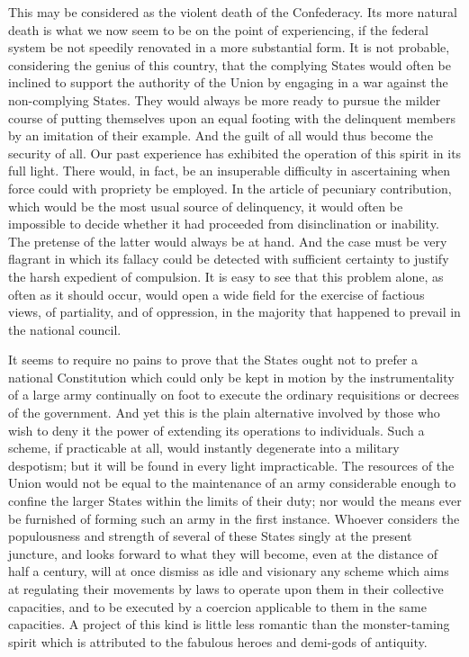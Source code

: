 This may be considered as the violent death of the Confederacy. Its more natural death is what we now seem to be on the point of experiencing, if the federal system be not speedily renovated in a more substantial form. It is not probable, considering the genius of this country, that the complying States would often be inclined to support the authority of the Union by engaging in a war against the non-complying States. They would always be more ready to pursue the milder course of putting themselves upon an equal footing with the delinquent members by an imitation of their example. And the guilt of all would thus become the security of all. Our past experience has exhibited the operation of this spirit in its full light. There would, in fact, be an insuperable difficulty in ascertaining when force could with propriety be employed. In the article of pecuniary contribution, which would be the most usual source of delinquency, it would often be impossible to decide whether it had proceeded from disinclination or inability. The pretense of the latter would always be at hand. And the case must be very flagrant in which its fallacy could be detected with sufficient certainty to justify the harsh expedient of compulsion. It is easy to see that this problem alone, as often as it should occur, would open a wide field for the exercise of factious views, of partiality, and of oppression, in the majority that happened to prevail in the national council.

It seems to require no pains to prove that the States ought not to prefer a national Constitution which could only be kept in motion by the instrumentality of a large army continually on foot to execute the ordinary requisitions or decrees of the government. And yet this is the plain alternative involved by those who wish to deny it the power of extending its operations to individuals. Such a scheme, if practicable at all, would instantly degenerate into a military despotism; but it will be found in every light impracticable. The resources of the Union would not be equal to the maintenance of an army considerable enough to confine the larger States within the limits of their duty; nor would the means ever be furnished of forming such an army in the first instance. Whoever considers the populousness and strength of several of these States singly at the present juncture, and looks forward to what they will become, even at the distance of half a century, will at once dismiss as idle and visionary any scheme which aims at regulating their movements by laws to operate upon them in their collective capacities, and to be executed by a coercion applicable to them in the same capacities. A project of this kind is little less romantic than the monster-taming spirit which is attributed to the fabulous heroes and demi-gods of antiquity.


